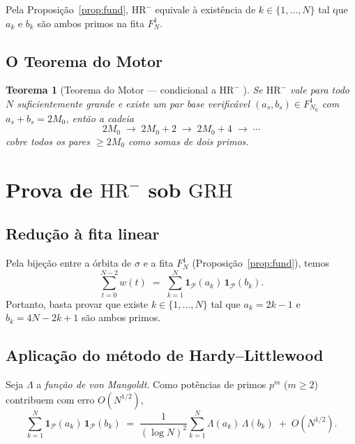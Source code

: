 \documentclass[12pt,a4paper]{article}
\newtheorem{theorem}{Teorema}[section]
\theoremstyle{definition}
\newcommand{\PP}{\mathcal{P}}          %
\newcommand{\HRm}{\mathrm{HR}^{-}}
\newcommand{\GRH}{\mathrm{GRH}}
\newcommand{\Lam}{\Lambda}             %
\newcommand{\1}[1]{\mathbf{1}_{#1}}
\begin{document}
	Pela Proposição~\ref{prop:fund}, $\HRm$ equivale à existência de
	$k \in \{1,\ldots,N\}$ tal que $a_k$ e $b_k$ são ambos primos na fita
	$F_N^1$.
	
	\subsection{O Teorema do Motor}
	
	\begin{theorem}[Teorema do Motor --- condicional a $\HRm$ {\cite[Thm.~7.3]{motor}}]
		\label{thm:motor}
		Se $\HRm$ vale para todo $N$ suficientemente grande e existe um par base
		verificável $(a_s, b_s) \in F_{N_0}^1$ com $a_s + b_s = 2M_0$, então a
		cadeia
		\[
		2M_0 \;\longrightarrow\; 2M_0+2 \;\longrightarrow\; 2M_0+4 \;\longrightarrow\; \cdots
		\]
		cobre todos os pares $\geq 2M_0$ como somas de dois primos.
	\end{theorem}
	
	\section{Prova de $\HRm$ sob $\GRH$}
	\label{sec:prova}
	
	\subsection{Redução à fita linear}
	
	Pela bijeção entre a órbita de $\sigma$ e a fita $F_N^1$
	(Proposição~\ref{prop:fund}), temos
	\[
	\sum_{t=0}^{N-2} w(t)
	\;=\;
	\sum_{k=1}^{N} \1{\PP}(a_k)\,\1{\PP}(b_k).
	\]
	Portanto, basta provar que existe $k \in \{1,\ldots,N\}$ tal que
	$a_k = 2k-1$ e $b_k = 4N-2k+1$ são ambos primos.
	
	\subsection{Aplicação do método de Hardy--Littlewood}
	
	Seja $\Lam$ a \emph{função de von Mangoldt}.
	Como potências de primos $p^m$ ($m \geq 2$) contribuem com erro $O(N^{1/2})$,
	\begin{equation}
		\label{eq:vonmang}
		\sum_{k=1}^{N} \1{\PP}(a_k)\,\1{\PP}(b_k)
		\;=\;
		\frac{1}{(\log N)^2}
		\sum_{k=1}^{N} \Lam(a_k)\,\Lam(b_k)
		\;+\;
		O\!\left(N^{1/2}\right).
	\end{equation}
	
\end{document}
